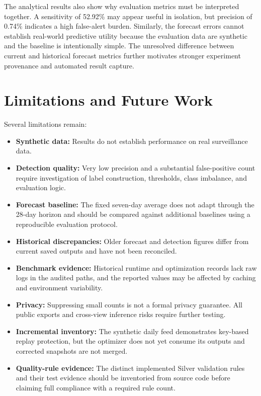 \documentclass[conference]{IEEEtran}
\begin{document}
The analytical results also show why evaluation metrics must be interpreted together. A sensitivity of 52.92\% may appear useful in isolation, but precision of 0.74\% indicates a high false-alert burden. Similarly, the forecast errors cannot establish real-world predictive utility because the evaluation data are synthetic and the baseline is intentionally simple. The unresolved difference between current and historical forecast metrics further motivates stronger experiment provenance and automated result capture.

\section{Limitations and Future Work}

Several limitations remain:
\begin{itemize}
    \item \textbf{Synthetic data:} Results do not establish performance on real surveillance data.
    \item \textbf{Detection quality:} Very low precision and a substantial false-positive count require investigation of label construction, thresholds, class imbalance, and evaluation logic.
    \item \textbf{Forecast baseline:} The fixed seven-day average does not adapt through the 28-day horizon and should be compared against additional baselines using a reproducible evaluation protocol.
    \item \textbf{Historical discrepancies:} Older forecast and detection figures differ from current saved outputs and have not been reconciled.
    \item \textbf{Benchmark evidence:} Historical runtime and optimization records lack raw logs in the audited paths, and the reported values may be affected by caching and environment variability.
    \item \textbf{Privacy:} Suppressing small counts is not a formal privacy guarantee. All public exports and cross-view inference risks require further testing.
    \item \textbf{Incremental inventory:} The synthetic daily feed demonstrates key-based replay protection, but the optimizer does not yet consume its outputs and corrected snapshots are not merged.
    \item \textbf{Quality-rule evidence:} The distinct implemented Silver validation rules and their test evidence should be inventoried from source code before claiming full compliance with a required rule count.
\end{itemize}
\end{document}
